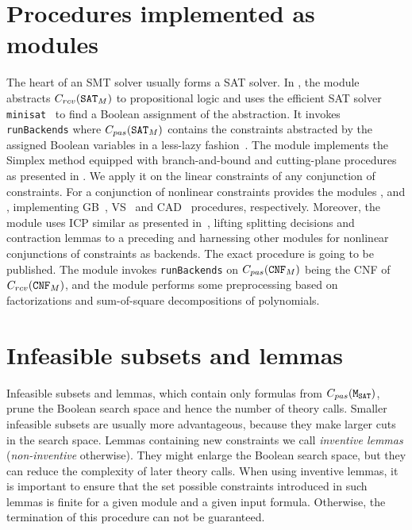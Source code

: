 \section{Procedures implemented as modules}
\label{sec:implemented_modules}
The heart of an SMT solver usually forms a SAT solver. In \smtrat, the module \satModule abstracts $C_{rcv}(\texttt{SAT$_M$})$ to propositional logic and uses the efficient SAT solver \texttt{minisat}~\cite{minisat} to find a Boolean assignment of the abstraction. It invokes \texttt{runBackends} where $C_{pas}(\texttt{SAT$_M$})$ contains the constraints abstracted by the assigned Boolean variables in a less-lazy fashion~\cite{sebastiani2007lazy}. The module \simplexModule implements the Simplex method equipped with branch-and-bound and cutting-plane procedures as presented in \cite{DM06}. We apply it on the linear constraints of any conjunction of \supportedLogics constraints. For a conjunction of nonlinear constraints \smtrat provides the modules \gbModule, \vsModule and \cadModule, implementing GB~\cite{JLCA_CAI13}, VS~\cite{Article_Corzilius_FCT2011} and CAD~\cite{Article_Loup_TubeCAD} procedures, respectively. Moreover, the module \icpModule uses ICP similar as presented in~\cite{GGIGSC10}, lifting splitting decisions and contraction lemmas to a preceding \satModule and harnessing other modules for nonlinear conjunctions of constraints as backends. The exact procedure is going to be published. The module \cnfModule invokes \texttt{runBackends} on $C_{pas}(\texttt{CNF$_M$})$ being the CNF of $C_{rcv}(\texttt{CNF$_M$})$, and the module \ppModule performs some preprocessing based on factorizations and sum-of-square decompositions of polynomials.

\section{Infeasible subsets and lemmas}
Infeasible subsets and lemmas, which contain only formulas from 
$C_{pas}(\texttt{M$_\text{SAT}$})$, prune the Boolean search space and hence the number of theory calls. 
Smaller infeasible subsets are usually more advantageous, because they make larger cuts 
in the search space. Lemmas containing new constraints we call
\emph{inventive lemmas} (\emph{non-inventive} otherwise). They might enlarge the 
Boolean search space, but they can reduce the complexity of later theory calls.
When using inventive lemmas, it is important to ensure that the set possible
constraints introduced in such lemmas is finite for a given module and a given 
input formula. Otherwise, the termination of this procedure can not be guaranteed.

